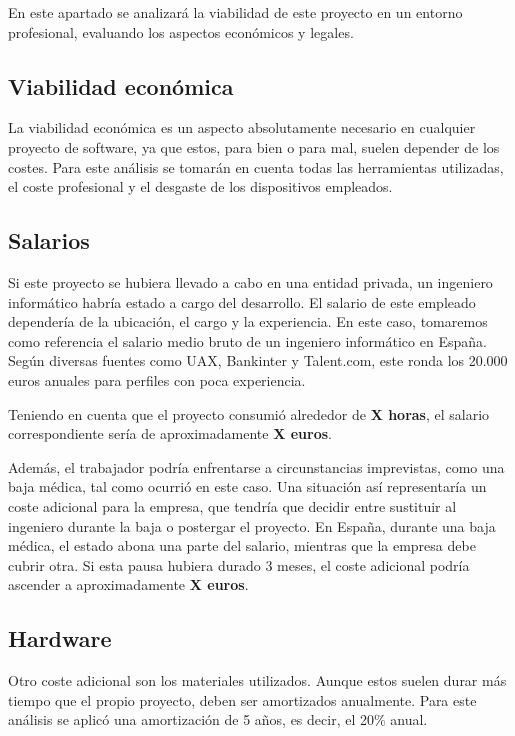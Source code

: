 En este apartado se analizará la viabilidad de este proyecto en un entorno profesional, evaluando los aspectos económicos y legales.

\subsection{Viabilidad económica}

La viabilidad económica es un aspecto absolutamente necesario en cualquier proyecto de software, ya que estos, para bien o para mal, suelen depender de los costes. Para este análisis se tomarán en cuenta todas las herramientas utilizadas, el coste profesional y el desgaste de los dispositivos empleados.

\subsection{Salarios}

Si este proyecto se hubiera llevado a cabo en una entidad privada, un ingeniero informático habría estado a cargo del desarrollo. El salario de este empleado dependería de la ubicación, el cargo y la experiencia. En este caso, tomaremos como referencia el salario medio bruto de un ingeniero informático en España. Según diversas fuentes como UAX, Bankinter y Talent.com, este ronda los 20.000 euros anuales para perfiles con poca experiencia.

Teniendo en cuenta que el proyecto consumió alrededor de \textbf{X horas}, el salario correspondiente sería de aproximadamente \textbf{X euros}. 

Además, el trabajador podría enfrentarse a circunstancias imprevistas, como una baja médica, tal como ocurrió en este caso. Una situación así representaría un coste adicional para la empresa, que tendría que decidir entre sustituir al ingeniero durante la baja o postergar el proyecto. En España, durante una baja médica, el estado abona una parte del salario, mientras que la empresa debe cubrir otra. Si esta pausa hubiera durado 3 meses, el coste adicional podría ascender a aproximadamente \textbf{X euros}.

\subsection{Hardware}

Otro coste adicional son los materiales utilizados. Aunque estos suelen durar más tiempo que el propio proyecto, deben ser amortizados anualmente. Para este análisis se aplicó una amortización de 5 años, es decir, el 20\% anual.

